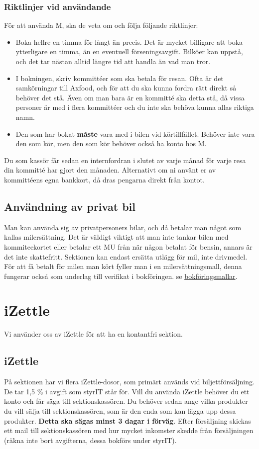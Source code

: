 \documentclass{article}
\begin{document}
\subsubsection{Riktlinjer vid användande}
För att använda M, ska de veta om och följa följande riktlinjer:
\begin{itemize}
    \item Boka hellre en timma för långt än precis. Det är mycket billigare att boka ytterligare en timma, än en eventuell förseningsavgift. Bilköer kan uppstå, och det tar nästan alltid längre tid att handla än vad man tror. 
    \item I bokningen, skriv kommittéer som ska betala för resan. Ofta är det samkörningar till Axfood, och för att du ska kunna fordra rätt direkt så behöver det stå. Även om man bara är en kommitté ska detta stå, då vissa personer är med i flera kommittéer och du inte ska behöva kunna allas riktiga namn. 
    \item Den som har bokat \textbf{måste} vara med i bilen vid körtillfället. Behöver inte vara den som kör, men den som kör behöver också ha konto hos M. 
\end{itemize}
Du som kassör får sedan en internfordran i slutet av varje månad för varje resa din kommitté har gjort den månaden. Alternativt om ni använt er av kommittéens egna bankkort, då dras pengarna direkt från kontot.

\subsection{Användning av privat bil}
Man kan använda sig av privatpersoners bilar, och då betalar man något som kallas milersättning. Det är väldigt viktigt att man inte tankar bilen med kommiteekortet eller betalar ett MU från när någon betalat för bensin, annars är det inte skattefritt. Sektionen kan endast ersätta utlägg för mil, inte drivmedel. 
För att få betalt för milen man kört fyller man i en milersättningsmall, denna fungerar också som underlag till verifikat i bokföringen. se \href{https://styrit.chalmers.it/wp-content/uploads/bokforingsmall.pdf}{bokföringsmallar}.


\section{iZettle}
\label{sec:izettle-swish}
Vi använder oss av iZettle för att ha en kontantfri sektion. 
\subsection{iZettle}
På sektionen har vi flera iZettle-dosor, som primärt används vid biljettförsäljning. De tar 1,5 \% i avgift som styrIT står för. Vill du använda iZettle behöver du ett konto och får säga till sektionskassören. Du behöver sedan ange vilka produkter du vill sälja till sektionskassören, som är den enda som kan lägga upp dessa produkter. \textbf{Detta ska sägas minst 3 dagar i förväg}. Efter försäljning skickas ett mail till sektionskassören med hur mycket inkomster skedde från försäljningen (räkna inte bort avgifterna, dessa bokförs under styrIT).
\end{document}
